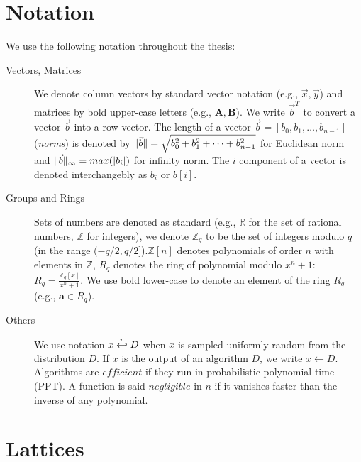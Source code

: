 \section{Notation}
\label{sec:defGeneral}
We use the following notation throughout the thesis:
\begin{description}
\item[Vectors, Matrices] We denote column vectors by standard vector notation
  (e.g., \(\vec{x}, \vec{y}\)) and matrices by bold upper-case letters (e.g.,
  \(\mathbf{A}, \mathbf{B}\)). We write \(\vec{b}^{T}\) to convert a vector
  \(\vec{b}\) into a row vector. The length of a vector
  \(\vec{b} = [b_{0}, b_{1}, \dots, b_{n-1}]\) (\textit{norms}) is denoted by
  \(\Vert \vec{b} \Vert = \sqrt{b_{0}^{2} + b_{1}^{2} + \dots + b_{n-1}^{2}}\) for
  Euclidean norm and \(\Vert \vec{b} \Vert_{\infty} = max(|b_{i}|)\) for infinity norm. The
  \(i\) component of a vector is denoted interchangebly as \(b_{i}\) or
  \(b[i]\).
\item[Groups and Rings] Sets of numbers are denoted as standard (e.g.,
  \(\mathbb{R}\) for the set of rational numbers, \(\mathbb{Z}\) for integers), we
  denote \(\mathbb{Z}_{q}\) to be the set of integers modulo \(q\) (in the range
  \((-q/2,q/2]\)).\(\mathbb{Z}[n]\) denotes polynomials of order \(n\) with
  elements in \(\mathbb{Z}\), \(R_{q}\) denotes the ring of polynomial modulo
  \(x^{n} + 1\): \(R_{q} = \frac{\mathbb{Z}_{q}[x]}{x^{n} + 1}\). We use bold
  lower-case to denote an element of the ring \(R_{q}\) (e.g.,
  \(\mathbf{a} \in R_q\)).
\item[Others] We use notation \(x \stackrel{r}{\hookleftarrow} D\) when \(x\) is sampled
  uniformly random from the distribution \(D\). If \(x\) is the output of an
  algorithm \(D\), we write \(x \gets D\). Algorithms are \(efficient\) if they
  run in probabilistic polynomial time (PPT). A function is said \(negligible\)
  in \(n\) if it vanishes faster than the inverse of any polynomial.
\end{description}

\section{Lattices}
\label{sec:defLattices}

